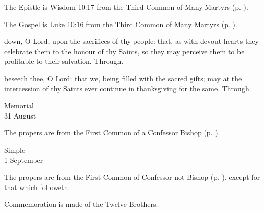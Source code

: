 \begin{rubric}
	The Epistle is Wisdom 10:17 from the Third Common of Many Martyrs (p. \pageref{CommonMartyrsIII}).
\end{rubric}


\begin{rubric}
	The Gospel is Luke 10:16 from the Third Common of Many Martyrs (p. \pageref{CommonMartyrsIII}).
\end{rubric}


\secret
{} down, O Lord, upon the sacrifices of thy people: that, as with devout hearts they celebrate them to the honour of thy Saints, so they may perceive them to be profitable to their salvation. Through.


\postcommunion
{} beseech thee, O Lord: that we, being filled with the sacred gifts; may at the intercession of thy Saints ever continue in thanksgiving for the same. Through.

\begin{inhead}
    {Memorial\\
31 August}
\end{inhead}

\begin{rubric}
	The propers are from the First Common of a Confessor Bishop (p. \pageref{CommonConfessorBishopI}).
\end{rubric}

\begin{inhead}
    {Simple\\
1 September}
\end{inhead}

\begin{rubric}
	The propers are from the First Common of Confessor not Bishop (p. \pageref{CommonConfessorNotBishopI}), except for that which followeth.\par
	Commemoration is made of the Twelve Brothers.
\end{rubric}


